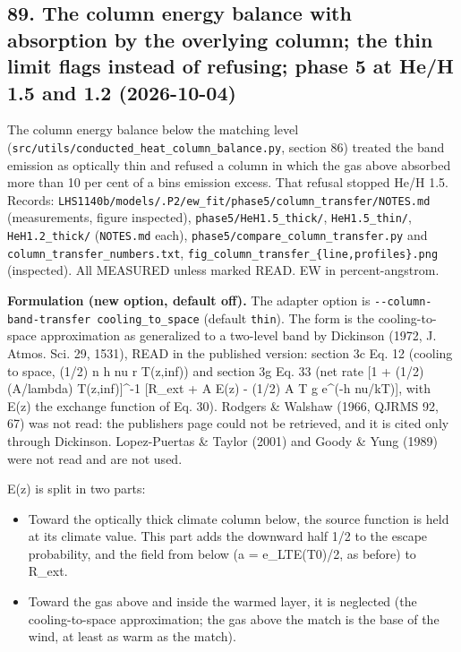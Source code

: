 \documentclass[english,a4paper]{my_memo}
\providecommand{\tightlist}{\setlength{\itemsep}{0pt}\setlength{\parskip}{0pt}}
\begin{document}
\subsection{89. The column energy balance with absorption by the overlying column; the thin limit flags instead of refusing; phase 5 at He/H 1.5 and 1.2 (2026-10-04)}\label{89-the-column-energy-balance-with-absorption-by-the-overlying-column-the-thin-limit-flags-instead-of-refusing-phase-5-at-heh-15-and-12-2026-10-04}

The column energy balance below the matching level
(\texttt{src/utils/conducted\_heat\_column\_balance.py}, section 86) treated the band
emission as optically thin and refused a column in which the gas above
absorbed more than 10 per cent of a bin\textquotesingle s emission excess. That refusal
stopped He/H 1.5. Records:
\texttt{LHS1140b/models/.P2/ew\_fit/phase5/column\_transfer/NOTES.md} (measurements,
figure inspected), \texttt{phase5/HeH1.5\_thick/}, \texttt{HeH1.5\_thin/}, \texttt{HeH1.2\_thick/}
(\texttt{NOTES.md} each), \texttt{phase5/compare\_column\_transfer.py} and
\texttt{column\_transfer\_numbers.txt}, \texttt{fig\_column\_transfer\_\{line,profiles\}.png}
(inspected). All MEASURED unless marked READ. EW in percent-angstrom.

\textbf{Formulation (new option, default off).} The adapter option is
\texttt{-\/-column-band-transfer\ cooling\_to\_space} (default \texttt{thin}). The form is the
cooling-to-space approximation as generalized to a two-level band by
Dickinson (1972, J. Atmos. Sci. 29, 1531), READ in the published version:
section 3c Eq. 12 (cooling to space, (1/2) n h nu r T(z,inf)) and section
3g Eq. 33 (net rate {[}1 + (1/2)(A/lambda) T(z,inf){]}\^{}-1 {[}R\_ext + A E(z) -
(1/2) A T g e\^{}(-h nu/kT){]}, with E(z) the exchange function of Eq. 30).
Rodgers \& Walshaw (1966, QJRMS 92, 67) was not read: the publisher\textquotesingle s page
could not be retrieved, and it is cited only through Dickinson.
Lopez-Puertas \& Taylor (2001) and Goody \& Yung (1989) were not read and are
not used.

E(z) is split in two parts:

\begin{itemize}
\tightlist
\item
  Toward the optically thick climate column below, the source function is
  held at its climate value. This part adds the downward half 1/2 to the
  escape probability, and the field from below (a = e\_LTE(T0)/2, as
  before) to R\_ext.
\item
  Toward the gas above and inside the warmed layer, it is neglected (the
  cooling-to-space approximation; the gas above the match is the base of
  the wind, at least as warm as the match).
\end{itemize}
\end{document}
